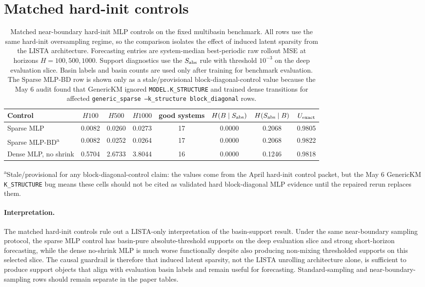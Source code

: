 \section{Matched hard-init controls}
\label{sec:supp_table_a4_matched_hard_init_controls}

\begin{table}[tbp]
\centering
\caption{Matched near-boundary hard-init MLP controls on the fixed multibasin benchmark.
All rows use the same hard-init oversampling regime, so the comparison isolates the
effect of induced latent sparsity from the LISTA architecture. Forecasting entries
are system-median best-periodic raw rollout MSE at horizons \(H=100,500,1000\).
Support diagnostics use the \(S_{\rm abs}\) rule with threshold \(10^{-3}\) on the
deep evaluation slice. Basin labels and basin counts are used only after training
for benchmark evaluation. The Sparse MLP-BD row is shown only as a stale/provisional
block-diagonal-control value because the May 6 audit found that GenericKM ignored
\texttt{MODEL.K\_STRUCTURE} and trained dense transitions for affected
\texttt{generic\_sparse --k\_structure block\_diagonal} rows.}
\label{tab:a4_matched_hard_init_controls}
\setlength{\tabcolsep}{4pt}
\begin{tabular}{lccccccc}
\toprule
Control & \(H100\) & \(H500\) & \(H1000\) & good systems & \(H(B\mid S_{\rm abs})\) & \(H(S_{\rm abs}\mid B)\) & \(U_{\rm exact}\) \\
\midrule
Sparse MLP & 0.0082 & 0.0260 & 0.0273 & 17 & 0.0000 & 0.2068 & 0.9805 \\
Sparse MLP-BD\textsuperscript{a} & 0.0082 & 0.0252 & 0.0264 & 17 & 0.0000 & 0.2068 & 0.9822 \\
Dense MLP, no shrink & 0.5704 & 2.6733 & 3.8044 & 16 & 0.0000 & 0.1246 & 0.9818 \\
\bottomrule
\end{tabular}
\par\smallskip
\parbox{0.98\linewidth}{\small
\textsuperscript{a}Stale/provisional for any block-diagonal-control claim:
the values come from the April hard-init control packet, but the May 6
GenericKM \texttt{K\_STRUCTURE} bug means these cells should not be cited as
validated hard block-diagonal MLP evidence until the repaired rerun replaces
them.}
\end{table}

\paragraph{Interpretation.}
The matched hard-init controls rule out a LISTA-only interpretation of the
basin-support result. Under the same near-boundary sampling protocol, the sparse
MLP control has basin-pure absolute-threshold supports on the deep evaluation
slice and strong short-horizon forecasting, while the dense no-shrink MLP is
much worse functionally despite also producing non-mixing thresholded supports
on this selected slice. The causal guardrail is therefore that induced latent
sparsity, not the LISTA unrolling architecture alone, is sufficient to produce
support objects that align with evaluation basin labels and remain useful for
forecasting. Standard-sampling and near-boundary-sampling rows should remain
separate in the paper tables.
